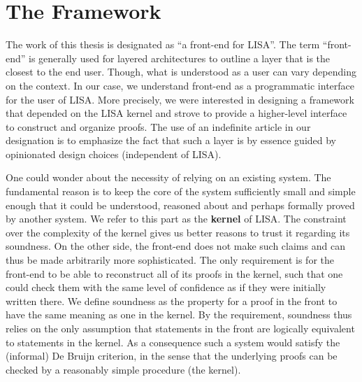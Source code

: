 \section{The Framework}
\label{sec:framework}

The work of this thesis is designated as ``a front-end for LISA''. The term ``front-end'' is generally used for layered architectures to outline a layer that is the closest to the end user. Though, what is understood as a user can vary depending on the context. In our case, we understand front-end as a programmatic interface for the user of LISA. More precisely, we were interested in designing a framework that depended on the LISA kernel and strove to provide a higher-level interface to construct and organize proofs. The use of an indefinite article in our designation is to emphasize the fact that such a layer is by essence guided by opinionated design choices (independent of LISA).

One could wonder about the necessity of relying on an existing system. The fundamental reason is to keep the core of the system sufficiently small and simple enough that it could be understood, reasoned about and perhaps formally proved by another system. We refer to this part as the \textbf{kernel} of LISA. The constraint over the complexity of the kernel gives us better reasons to trust it regarding its soundness. On the other side, the front-end does not make such claims and can thus be made arbitrarily more sophisticated. The only requirement is for the front-end to be able to reconstruct all of its proofs in the kernel, such that one could check them with the same level of confidence as if they were initially written there. We define soundness as the property for a proof in the front to have the same meaning as one in the kernel. By the requirement, soundness thus relies on the only assumption that statements in the front are logically equivalent to statements in the kernel. As a consequence such a system would satisfy the (informal) De Bruijn criterion, in the sense that the underlying proofs can be checked by a reasonably simple procedure (the kernel).

